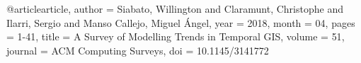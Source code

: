 @article{article,
author = {Siabato, Willington and Claramunt, Christophe and Ilarri, Sergio and Manso Callejo, Miguel Ángel},
year = {2018},
month = {04},
pages = {1-41},
title = {A Survey of Modelling Trends in Temporal GIS},
volume = {51},
journal = {ACM Computing Surveys},
doi = {10.1145/3141772}
}